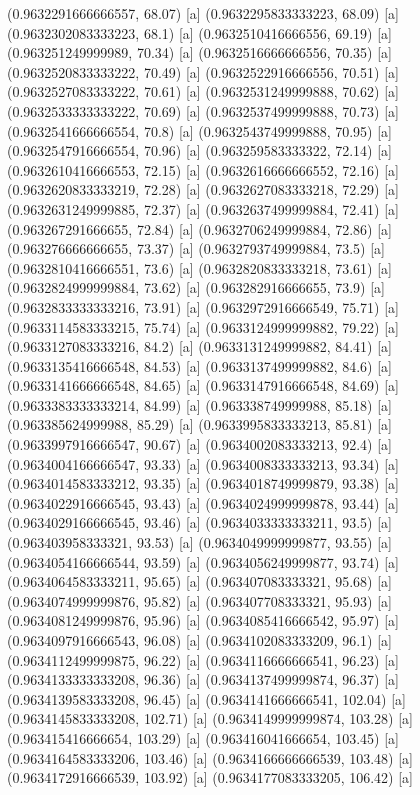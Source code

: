 {{{(0.9632291666666557, 68.07) [a] 
(0.9632295833333223, 68.09) [a] 
(0.9632302083333223, 68.1) [a] 
(0.9632510416666556, 69.19) [a] 
(0.963251249999989, 70.34) [a] 
(0.9632516666666556, 70.35) [a] 
(0.9632520833333222, 70.49) [a] 
(0.9632522916666556, 70.51) [a] 
(0.9632527083333222, 70.61) [a] 
(0.9632531249999888, 70.62) [a] 
(0.9632533333333222, 70.69) [a] 
(0.9632537499999888, 70.73) [a] 
(0.9632541666666554, 70.8) [a] 
(0.9632543749999888, 70.95) [a] 
(0.9632547916666554, 70.96) [a] 
(0.963259583333322, 72.14) [a] 
(0.9632610416666553, 72.15) [a] 
(0.9632616666666552, 72.16) [a] 
(0.9632620833333219, 72.28) [a] 
(0.9632627083333218, 72.29) [a] 
(0.9632631249999885, 72.37) [a] 
(0.9632637499999884, 72.41) [a] 
(0.963267291666655, 72.84) [a] 
(0.9632706249999884, 72.86) [a] 
(0.963276666666655, 73.37) [a] 
(0.9632793749999884, 73.5) [a] 
(0.9632810416666551, 73.6) [a] 
(0.9632820833333218, 73.61) [a] 
(0.9632824999999884, 73.62) [a] 
(0.963282916666655, 73.9) [a] 
(0.9632833333333216, 73.91) [a] 
(0.9632972916666549, 75.71) [a] 
(0.9633114583333215, 75.74) [a] 
(0.9633124999999882, 79.22) [a] 
(0.9633127083333216, 84.2) [a] 
(0.9633131249999882, 84.41) [a] 
(0.9633135416666548, 84.53) [a] 
(0.9633137499999882, 84.6) [a] 
(0.9633141666666548, 84.65) [a] 
(0.9633147916666548, 84.69) [a] 
(0.9633383333333214, 84.99) [a] 
(0.963338749999988, 85.18) [a] 
(0.963385624999988, 85.29) [a] 
(0.9633995833333213, 85.81) [a] 
(0.9633997916666547, 90.67) [a] 
(0.9634002083333213, 92.4) [a] 
(0.9634004166666547, 93.33) [a] 
(0.9634008333333213, 93.34) [a] 
(0.9634014583333212, 93.35) [a] 
(0.9634018749999879, 93.38) [a] 
(0.9634022916666545, 93.43) [a] 
(0.9634024999999878, 93.44) [a] 
(0.9634029166666545, 93.46) [a] 
(0.9634033333333211, 93.5) [a] 
(0.963403958333321, 93.53) [a] 
(0.9634049999999877, 93.55) [a] 
(0.9634054166666544, 93.59) [a] 
(0.9634056249999877, 93.74) [a] 
(0.9634064583333211, 95.65) [a] 
(0.963407083333321, 95.68) [a] 
(0.9634074999999876, 95.82) [a] 
(0.963407708333321, 95.93) [a] 
(0.9634081249999876, 95.96) [a] 
(0.9634085416666542, 95.97) [a] 
(0.9634097916666543, 96.08) [a] 
(0.9634102083333209, 96.1) [a] 
(0.9634112499999875, 96.22) [a] 
(0.9634116666666541, 96.23) [a] 
(0.9634133333333208, 96.36) [a] 
(0.9634137499999874, 96.37) [a] 
(0.9634139583333208, 96.45) [a] 
(0.9634141666666541, 102.04) [a] 
(0.9634145833333208, 102.71) [a] 
(0.9634149999999874, 103.28) [a] 
(0.963415416666654, 103.29) [a] 
(0.963416041666654, 103.45) [a] 
(0.9634164583333206, 103.46) [a] 
(0.9634166666666539, 103.48) [a] 
(0.9634172916666539, 103.92) [a] 
(0.9634177083333205, 106.42) [a] 
}}}
